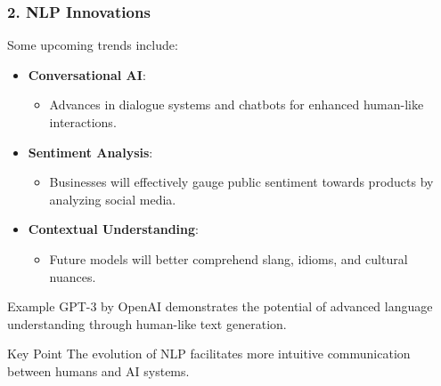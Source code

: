 \documentclass[aspectratio=169]{beamer}
\begin{document}
\begin{frame}[fragile]
    \frametitle{2. NLP Innovations}
    Some upcoming trends include:
    \begin{itemize}
        \item \textbf{Conversational AI}:
        \begin{itemize}
            \item Advances in dialogue systems and chatbots for enhanced human-like interactions.
        \end{itemize}
        
        \item \textbf{Sentiment Analysis}:
        \begin{itemize}
            \item Businesses will effectively gauge public sentiment towards products by analyzing social media.
        \end{itemize}
        
        \item \textbf{Contextual Understanding}:
        \begin{itemize}
            \item Future models will better comprehend slang, idioms, and cultural nuances.
        \end{itemize}
    \end{itemize}
    \begin{block}{Example}
        GPT-3 by OpenAI demonstrates the potential of advanced language understanding through human-like text generation.
    \end{block}
    \begin{block}{Key Point}
        The evolution of NLP facilitates more intuitive communication between humans and AI systems.
    \end{block}
\end{frame}
\end{document}
